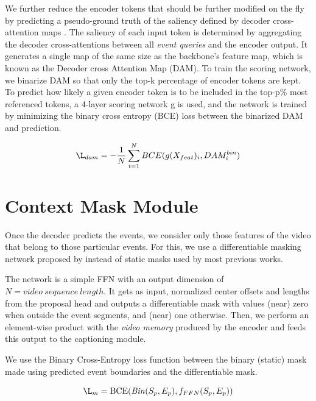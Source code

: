 \par We further reduce the encoder tokens that should be further modified on the fly by
predicting a pseudo-ground truth of the saliency defined by decoder cross-attention maps \cite{roh2021sparse}.
The saliency of each input token is determined by aggregating the decoder cross-attentions between all \textit{event queries} and the encoder output. It generates a single map of the same size as the backbone’s feature map, which is known as the Decoder cross Attention Map (DAM). To train the scoring network, we binarize DAM so that only the top-k percentage of encoder tokens are
kept. To predict how likely a given encoder token is to be included in the top-p\% most referenced tokens, a 4-layer scoring network g is used, and the network is trained by minimizing the binary cross entropy (BCE) loss between the binarized DAM and prediction.

$$\L_{dam} = -\frac{1}{N}\displaystyle\sum\limits_{i=1}^N BCE(g(X_{feat})_i, DAM^{bin}_i)$$


\section{Context Mask Module}
\par Once the decoder predicts the events, we consider only those features of the video that belong to those particular events. For this, we use a differentiable masking network proposed by \cite{zhou2018end} instead of static masks used by most previous works.
\par The network is a simple FFN with an output dimension of $N=video\ sequence\ length$. It gets as input, normalized center offsets and lengths from the proposal head and outputs a differentiable mask with values (near) zero when outside the event segments, and (near) one otherwise. Then, we perform an element-wise product with the \textit{video memory} produced by the encoder and feeds this output to the captioning module.
\par We use the Binary Cross-Entropy loss function between the binary (static) mask made using predicted event boundaries and the differentiable mask.

$$\L_{m} = \textrm{BCE}(\mathit{Bin}(S_{p}, E_{p}), f_{FFN}(S_{p}, E_{p}))$$



